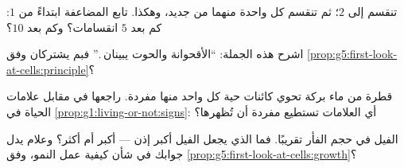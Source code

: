 \begin{exercise}[$\star$]\label{exo:g5:first-look-at-cells:8}
تنقسم  إلى $2$؛ ثم تنقسم كل واحدة منهما من جديد، وهكذا. تابع
المضاعفة ابتداءً من $1$: كم  بعد $5$ انقسامات؟ وكم بعد $10$؟
\end{exercise}

\begin{exercise}[$\star\star$]\label{exo:g5:first-look-at-cells:9}
اشرح هذه الجملة: ``الأقحوانة والحوت يبينان .'' فبم
يشتركان وفق \cref{prop:g5:first-look-at-cells:principle}؟
\end{exercise}

\begin{exercise}[$\star\star$]\label{exo:g5:first-look-at-cells:10}
قطرة من ماء بركة تحوي كائنات حية كل واحد منها  مفردة. راجعها
في مقابل علامات الحياة في \cref{prop:g1:living-or-not:signs}: أي
العلامات تستطيع  مفردة أن تُظهرها؟
\end{exercise}

\begin{exercise}[$\star\star\star$]\label{exo:g5:first-look-at-cells:11}
 الفيل في حجم  الفأر تقريبًا. فما الذي يجعل الفيل أكبر
إذن ---  أكبر أم  أكثر؟ وعلام يدل جوابك في شأن كيفية
عمل النمو، وفق \cref{prop:g5:first-look-at-cells:growth}؟
\end{exercise}
